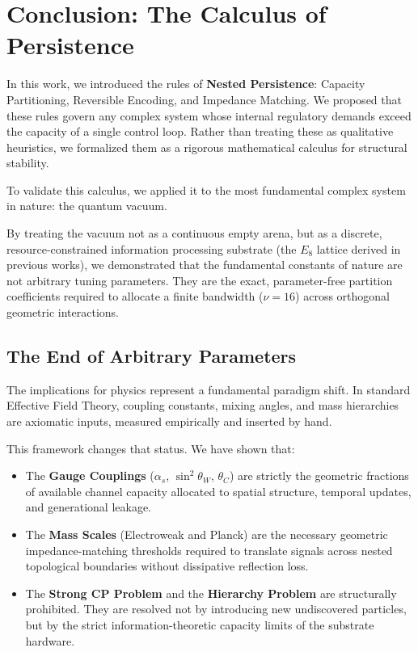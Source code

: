 \section{Conclusion: The Calculus of Persistence}

In this work, we introduced the rules of \textbf{Nested Persistence}: Capacity Partitioning, Reversible Encoding, and Impedance Matching. We proposed that these rules govern any complex system whose internal regulatory demands exceed the capacity of a single control loop. Rather than treating these as qualitative heuristics, we formalized them as a rigorous mathematical calculus for structural stability. 

To validate this calculus, we applied it to the most fundamental complex system in nature: the quantum vacuum. 

By treating the vacuum not as a continuous empty arena, but as a discrete, resource-constrained information processing substrate (the $E_8$ lattice derived in previous works), we demonstrated that the fundamental constants of nature are not arbitrary tuning parameters. They are the exact, parameter-free partition coefficients required to allocate a finite bandwidth ($\nu=16$) across orthogonal geometric interactions.

\subsection{The End of Arbitrary Parameters}

The implications for physics represent a fundamental paradigm shift. In standard Effective Field Theory, coupling constants, mixing angles, and mass hierarchies are axiomatic inputs, measured empirically and inserted by hand. 

This framework changes that status. We have shown that:
\begin{itemize}
    \item The \textbf{Gauge Couplings} ($\alpha_s$, $\sin^2 \theta_W$, $\theta_C$) are strictly the geometric fractions of available channel capacity allocated to spatial structure, temporal updates, and generational leakage.
    \item The \textbf{Mass Scales} (Electroweak and Planck) are the necessary geometric impedance-matching thresholds required to translate signals across nested topological boundaries without dissipative reflection loss.
    \item The \textbf{Strong CP Problem} and the \textbf{Hierarchy Problem} are structurally prohibited. They are resolved not by introducing new undiscovered particles, but by the strict information-theoretic capacity limits of the substrate hardware. 
\end{itemize}

